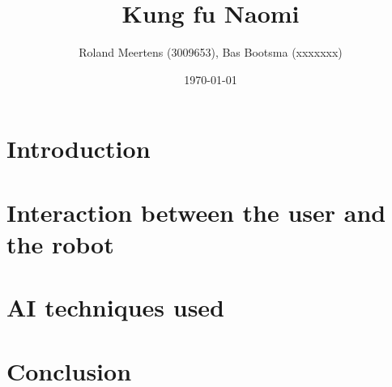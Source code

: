 \documentclass[a4paper,10pt]{article}
\begin{document}
\title{Kung fu Naomi}

\author{Roland Meertens (3009653), Bas Bootsma (xxxxxxx)}

\date{\today}

\maketitle



\section{Introduction}

\section{Interaction between the user and the robot}

\section{AI techniques used}

\section{Conclusion}



\end{document}

